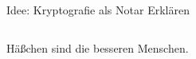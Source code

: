\documentclass{rosenpass-beamer}
\newcommand*{\imgNote}[1]{\begin{center}\setlength{\parskip}{0pt}\tiny\raggedright#1\end{center}}
\begin{document}
\begin{frame}{Idee: Kryptografie als Notar Erklären}
\begin{columns}[c]
\begin{column}{0.2\textwidth}
  \imgNote{Häßchen sind die besseren Menschen.}
\end{column}

\end{columns}
\end{frame}
\end{document}
